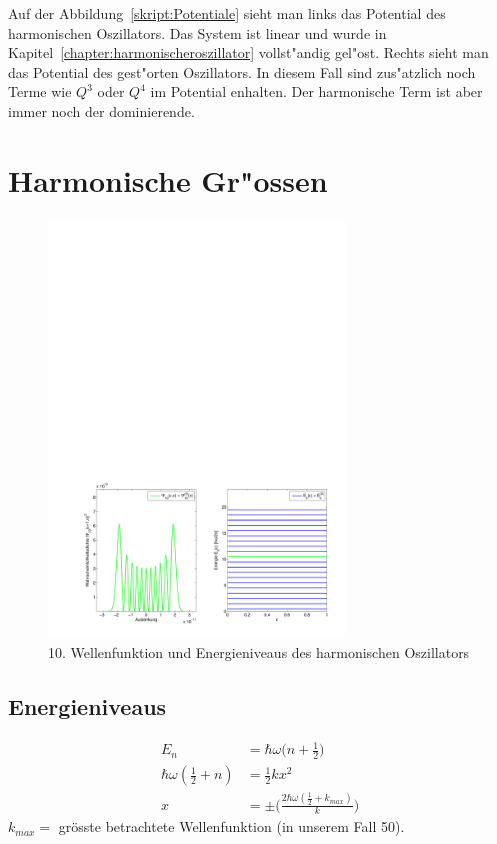 \begin{refsection}
Auf der Abbildung~\ref{skript:Potentiale} sieht man links das Potential des harmonischen Oszillators. Das System ist linear und wurde in Kapitel~\ref{chapter:harmonischeroszillator} vollst"andig gel"ost. Rechts sieht man das Potential des gest"orten Oszillators. In diesem Fall sind zus"atzlich noch Terme wie $Q^3$ oder $Q^4$ im Potential enhalten. Der harmonische Term ist aber immer noch der dominierende.

\section{Harmonische Gr"ossen}

\begin{figure}	%
\centering
\includegraphics[width=0.7\textwidth]{anharmonisch/images/Harmonisch.pdf}
\caption{10. Wellenfunktion und Energieniveaus des harmonischen Oszillators
\label{skript:Harmonisch}}
\end{figure}

\subsection{Energieniveaus}
\begin{align*}
E_n
&=
\hbar\omega\biggl(n+\frac12\biggr)
\\
\hbar\omega(\frac12+n)
&=
\frac12 kx^2
\\
x
&=
\pm\biggl(\frac{2\hbar\omega(\frac12+k_{max})}k\biggr)
\end{align*}
$k_{max}=$ grösste betrachtete Wellenfunktion (in unserem Fall 50).



\end{refsection}
